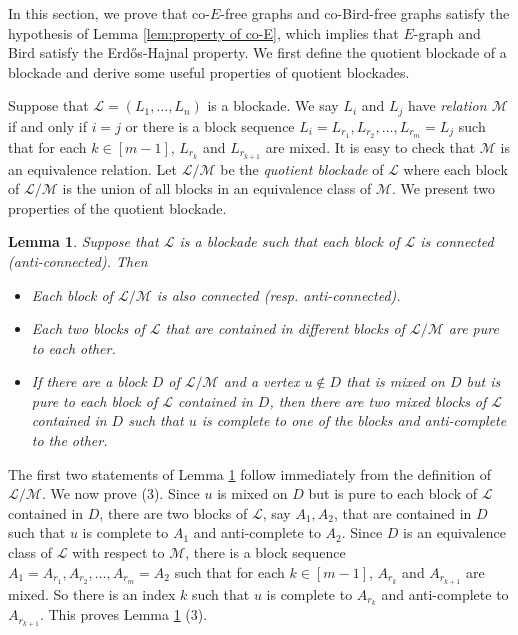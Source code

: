 \documentclass[a4paper,11pt]{article}
\newtheorem{lemma}[theorem]{Lemma}
\let\oldendproof\endproof
\renewenvironment{proof}[1][\proofname]{%
	\oldproof[\normalfont\bfseries #1]%
}{\oldendproof}
\begin{document}
In this section, we prove that co-$E$-free graphs and co-Bird-free graphs satisfy the hypothesis of Lemma \ref{lem:property of co-E}, which implies that $E$-graph and Bird satisfy the Erd\H{o}s-Hajnal property. 
We first define the quotient blockade of a blockade and derive some useful properties of quotient blockades.

Suppose that $\mathcal{L}=(L_1,\ldots, L_n)$ is a blockade. 
        We say $L_i$ and $L_j$ have {\em relation $\mathcal{M}$} if and only if $i= j$ or there is a block sequence $L_i=L_{r_1},L_{r_2},\ldots,L_{r_m}=L_{j}$ such that for each $k\in [m-1]$, $L_{r_{k}}$ and $L_{r_{k+1}}$ are mixed. 
        It is easy to check that $\mathcal{M}$ is an equivalence relation. Let $\mathcal{L}/\mathcal{M}$ be the {\em quotient blockade} of $\mathcal{L}$ where each block of $\mathcal{L}/\mathcal{M}$ is the union of all blocks in an equivalence class of $\mathcal{M}$.
        We present two properties of the quotient blockade. 
        \begin{lemma}\label{clm:property of levels}
            Suppose that $\mathcal{L}$ is a blockade such that each block of $\mathcal{L}$ is connected (anti-connected). 
            Then  
            \begin{itemize}
                \item[$(1)$] Each block of $\mathcal{L}/\mathcal{M}$ is also connected (resp. anti-connected).
                
                \item[$(2)$] Each two blocks of $\mathcal{L}$ that are contained in different blocks of $\mathcal{L}/\mathcal{M}$ are pure to each other.
                
                \item[$(3)$] If there are a block $D$ of $\mathcal{L}/\mathcal{M}$ and a vertex $u\notin D$ that is mixed on $D$ but is pure to each block of $\mathcal{L}$ contained in $D$, then there are two mixed blocks of $\mathcal{L}$ contained in $D$ such that $u$ is complete to one of the blocks and anti-complete to the other.
    
            \end{itemize}
        \end{lemma}
        
        \begin{proof}
            The first two statements of Lemma \ref{clm:property of levels} follow immediately from the definition of $\mathcal{L}/\mathcal{M}$. 
            We now prove (3). Since $u$ is mixed on $D$ but is pure to each block of $\mathcal{L}$ contained in $D$, there are two blocks of $\mathcal{L}$, say $A_1,A_2$, that are contained in $D$ such that $u$ is complete to $A_1$ and anti-complete to $A_2$. 
            Since $D$ is an equivalence class of $\mathcal{L}$ with respect to $\mathcal{M}$, there is a block sequence $A_1=A_{r_1},A_{r_2},\ldots,A_{r_m}=A_{2}$ such that for each $k\in [m-1]$, $A_{r_{k}}$ and $A_{r_{k+1}}$ are mixed. 
            So there is an index $k$ such that $u$ is complete to $A_{r_{k}}$ and anti-complete to $A_{r_{k+1}}$.  
            This proves Lemma \ref{clm:property of levels} (3). 
        \end{proof}
\end{document}
